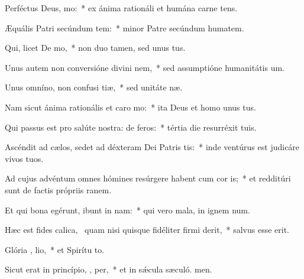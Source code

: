 \item Perféctus Deus,  mo:~* ex ánima rationáli et humána carne tens.
\item Æquális Patri secúndum tem:~* minor Patre secúndum humatem.
\item Qui, licet De   mo,~* non duo tamen, sed unus  tus.
\item Unus autem non conversióne divini  nem,~* sed assumptióne humanitátis  um.
\item Unus omníno, non confusi tiæ,~* sed unitáte næ.
\item Nam sicut ánima rationális et caro   mo:~* ita Deus et homo unus  tus.
\item Qui passus est pro salúte nostra: de  feros:~* tértia die resurréxit  tuis.
\item Ascéndit ad cælos, sedet ad déxteram Dei Patris tis:~* inde ventúrus est judicáre vivos  tuos.
\item Ad cujus advéntum omnes hómines resúrgere habent cum cor is;~* et redditúri sunt de factis própriis ranem.
\item Et qui bona egérunt, ibunt in  nam:~* qui vero mala, in ignem num.
\item Hæc est fides calica,~\pscross{} quam nisi quisque fidéliter firmi derit,~* salvus esse  erit.
\item Glória ,  lio,~* et Spirítu to.
\item Sicut erat in princípio,  ,  per,~* et in sǽcula sæculó. men.
